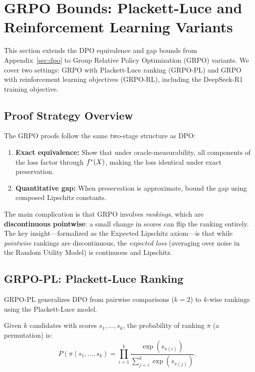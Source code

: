 \section{GRPO Bounds: Plackett-Luce and Reinforcement Learning Variants}
\label{sec:grpo}

This section extends the DPO equivalence and gap bounds from Appendix~\ref{sec:dpo} to Group Relative Policy Optimization (GRPO) variants. We cover two settings: GRPO with Plackett-Luce ranking (GRPO-PL) and GRPO with reinforcement learning objectives (GRPO-RL), including the DeepSeek-R1 training objective.

\subsection{Proof Strategy Overview}

The GRPO proofs follow the same two-stage structure as DPO:
\begin{enumerate}
    \item \textbf{Exact equivalence:} Show that under oracle-measurability, all components of the loss factor through $f^{\ast}(X)$, making the loss identical under exact preservation.
    \item \textbf{Quantitative gap:} When preservation is approximate, bound the gap using composed Lipschitz constants.
\end{enumerate}

The main complication is that GRPO involves \emph{rankings}, which are \textbf{discontinuous pointwise}: a small change in scores can flip the ranking entirely. The key insight---formalized as the Expected Lipschitz axiom---is that while \emph{pointwise} rankings are discontinuous, the \emph{expected loss} (averaging over noise in the Random Utility Model) is continuous and Lipschitz.

\subsection{GRPO-PL: Plackett-Luce Ranking}

GRPO-PL generalizes DPO from pairwise comparisons ($k=2$) to $k$-wise rankings using the Plackett-Luce model.

\begin{definition}
Given $k$ candidates with scores $s_1, \ldots, s_k$, the probability of ranking $\pi$ (a permutation) is:
\[
P(\pi \mid s_1, \ldots, s_k) = \prod_{i=1}^{k} \frac{\exp(s_{\pi(i)})}{\sum_{j=i}^{k} \exp(s_{\pi(j)})}.
\]
\end{definition}

